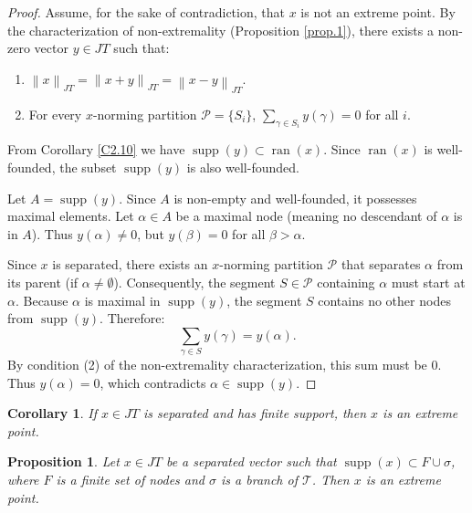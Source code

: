 \documentclass[11pt,a4paper]{amsart}
\newtheorem{proposition}[theorem]{Proposition}
\newtheorem{corollary}[theorem]{Corollary}
\newcommand{\JT}{JT}
\newcommand{\Tree}{\mathcal{T}}
\newcommand{\norm}[1]{\left\lVert#1\right\rVert}
\newcommand{\supp}{\operatorname{supp}}
\newcommand{\ran}{\operatorname{ran}}
\begin{document}
\begin{proof}
    Assume, for the sake of contradiction, that $x$ is not an extreme point. By the characterization of non-extremality (Proposition \ref{prop.1}), there exists a non-zero vector $y \in \JT$ such that:
    \begin{enumerate}
        \item $\norm{x}_{\JT} = \norm{x+y}_{\JT} = \norm{x-y}_{\JT}$.
        \item For every $x$-norming partition $\mathcal{P} = \{S_i\}$, $\sum_{\gamma \in S_i} y(\gamma) = 0$ for all $i$.
    \end{enumerate}
    From Corollary \ref{C2.10} we have  $\supp(y) \subset \ran(x)$. Since $\ran(x)$ is well-founded, the subset $\supp(y)$ is also well-founded.
    
    Let $A = \supp(y)$. Since $A$ is non-empty and well-founded, it possesses maximal elements. Let $\alpha \in A$ be a maximal node (meaning no descendant of $\alpha$ is in $A$). Thus $y(\alpha) \neq 0$, but $y(\beta) = 0$ for all $\beta > \alpha$.
    
    Since $x$ is separated, there exists an $x$-norming partition $\mathcal{P}$ that separates $\alpha$ from its parent (if $\alpha \neq \emptyset$). Consequently, the segment $S \in \mathcal{P}$ containing $\alpha$ must start at $\alpha$. Because $\alpha$ is maximal in $\supp(y)$, the segment $S$ contains no other nodes from $\supp(y)$. Therefore:
    \[ \sum_{\gamma \in S} y(\gamma) = y(\alpha). \]
    By condition (2) of the non-extremality characterization, this sum must be 0. Thus $y(\alpha) = 0$, which contradicts $\alpha \in \supp(y)$.
\end{proof}

\begin{corollary}
    If $x \in \JT$ is separated and has finite support, then $x$ is an extreme point.
\end{corollary}

\begin{proposition}
    Let $x \in \JT$ be a separated vector such that $\supp(x) \subset F \cup \sigma$, where $F$ is a finite set of nodes and $\sigma$ is a branch of $\Tree$. Then $x$ is an extreme point.
\end{proposition}
\end{document}
